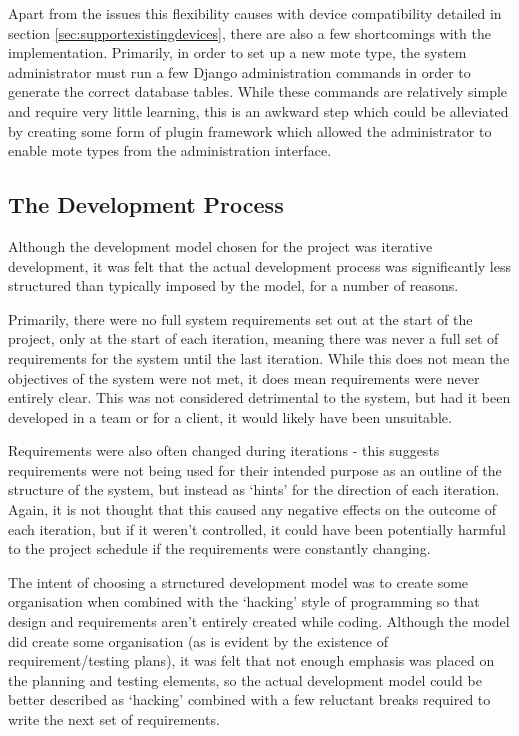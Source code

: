 \documentclass[a4papert,11pt,notitlepage]{article}
\begin{document}
Apart from the issues this flexibility causes with device compatibility detailed in section \ref{sec:supportexistingdevices}, there are also a few shortcomings with the implementation. Primarily, in order to set up a new mote type, the system administrator must run a few Django administration commands in order to generate the correct database tables. While these commands are relatively simple and require very little learning, this is an awkward step which could be alleviated by creating some form of plugin framework which allowed the administrator to enable mote types from the administration interface. 

\subsection{The Development Process}
\label{sec:devprocess}
Although the development model chosen for the project was iterative development, it was felt that the actual development process was significantly less structured than typically imposed by the model, for a number of reasons.

Primarily, there were no full system requirements set out at the start of the project, only at the start of each iteration, meaning there was never a full set of requirements for the system until the last iteration. While this does not mean the objectives of the system were not met, it does mean requirements were never entirely clear. This was not considered detrimental to the system, but had it been developed in a team or for a client, it would likely have been unsuitable.

Requirements were also often changed during iterations - this suggests requirements were not being used for their intended purpose as an outline of the structure of the system, but instead as `hints' for the direction of each iteration. Again, it is not thought that this caused any negative effects on the outcome of each iteration, but if it weren't controlled, it could have been potentially harmful to the project schedule if the requirements were constantly changing.

The intent of choosing a structured development model was to create some organisation when combined with the `hacking' style of programming so that design and requirements aren't entirely created while coding. Although the model did create some organisation (as is evident by the existence of requirement/testing plans), it was felt that not enough emphasis was placed on the planning and testing elements, so the actual development model could be better described as `hacking' combined with a few reluctant breaks required to write the next set of requirements.
\end{document}

